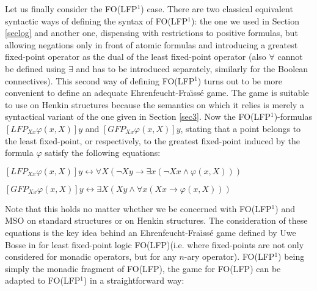 \documentclass{LMCS}
\newcommand{\mso}{\textsf{MSO}\xspace}
\newcommand{\folfp}{\textsf{FO(LFP$^1$)}\xspace}
\newcommand{\lfp}{\textsf{FO(LFP)}\xspace}
\begin{document}
Let us finally consider the \folfp case. There are two classical
equivalent syntactic ways of defining the syntax of \folfp: the one
we used in Section \ref{seclog} and another one, dispensing with
restrictions to positive formulas, but allowing negations only in
front of atomic formulas and introducing a greatest fixed-point
operator as the dual of the least fixed-point operator (also
$\forall$ cannot be defined using $\exists$ and has to be
introduced separately, similarly for the Boolean connectives).
This second way of defining \folfp turns out to be more convenient
to define an adequate Ehrenfeucht-Fra\"{\i}ss\'e game. The game is
suitable to use on Henkin structures because the semantics on
which it relies is merely a syntactical variant of the one given
in Section \ref{sec3}. Now the \folfp-formulas $[LFP_{Xx}
\varphi(x,X)]y$ and $[GFP_{Xx} \varphi(x,X)]y$, stating that a
point belongs to the least fixed-point, or respectively, to the
greatest fixed-point induced by the formula $\varphi$ satisfy the
following equations:
\begin{center}
$[LFP_{Xx} \varphi(x,X)]y \leftrightarrow \forall X (\neg Xy
\rightarrow \exists x (\neg Xx \wedge \varphi(x,X)))$

$[GFP_{Xx} \varphi(x,X)]y \leftrightarrow \exists X (Xy \wedge
\forall x(Xx \rightarrow \varphi(x,X)))$
\end{center}
Note that this holds no matter whether we be concerned with \folfp and \mso on
standard structures or on Henkin structures. The consideration of
these equations is the key idea behind an
Ehrenfeucht-Fra\"{\i}ss\'e game defined by Uwe Bosse in
\cite{736408} for least fixed-point logic \lfp (i.e. where
fixed-points are not only considered for monadic operators, but
for any $n$-ary operator). \folfp being simply the monadic
fragment of \lfp, the game for \lfp can be adapted to \folfp in a
straightforward way:
\end{document}
